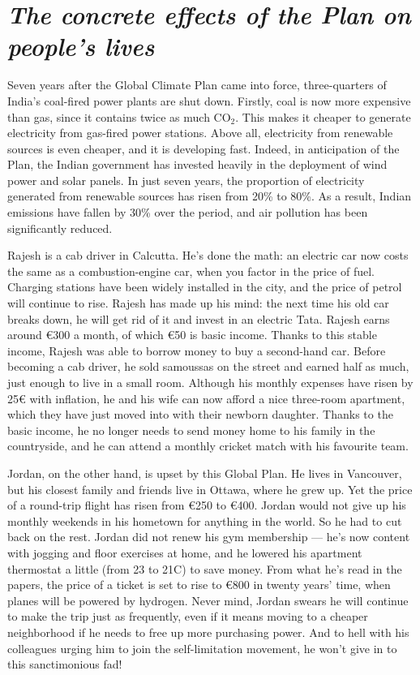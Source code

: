 \documentclass[a5paper,english,openany]{memoir}
\begin{document}
\chapter*{\textit{The concrete effects of the Plan on people's lives}}\label{ch:narr_bilan}

Seven years after the Global Climate Plan came into force, three-quarters of India's coal-fired power plants are shut down. Firstly, coal is now more expensive than gas, since it contains twice as much CO$_\text{2}$. This makes it cheaper to generate electricity from gas-fired power stations. Above all, electricity from renewable sources is even cheaper, and it is developing fast. Indeed, in anticipation of the Plan, the Indian government has invested heavily in the deployment of wind power and solar panels. In just seven years, the proportion of electricity generated from renewable sources has risen from 20\% to 80\%. As a result, Indian emissions have fallen by 30\% over the period, and air pollution has been significantly reduced. 

Rajesh is a cab driver in Calcutta. He's done the math: an electric car now costs the same as a combustion-engine car, when you factor in the price of fuel. Charging stations have been widely installed in the city, and the price of petrol will continue to rise. Rajesh has made up his mind: the next time his old car breaks down, he will get rid of it and invest in an electric Tata. Rajesh earns around \euro{}300 a month, of which \euro{}50 is basic income. Thanks to this stable income, Rajesh was able to borrow money to buy a second-hand car. %
Before becoming a cab driver, he sold samoussas on the street and earned half as much, just enough to live in a small room. Although his monthly expenses have risen by 25\euro{} with inflation, he and his wife can now afford a nice three-room apartment, which they have just moved into with their newborn daughter. Thanks to the basic income, he no longer needs to send money home to his family in the countryside, and he can attend a monthly cricket match with his favourite team. 

Jordan, on the other hand, is upset by this Global Plan. He lives in Vancouver, but his closest family and friends live in Ottawa, where he grew up. Yet the price of a round-trip flight has risen from \euro{}250 to \euro{}400. Jordan would not give up his monthly weekends in his hometown for anything in the world. So he had to cut back on the rest. Jordan did not renew his gym membership --- he's now content with jogging and floor exercises at home, and he lowered his apartment thermostat a little (from 23 to 21\textdegree{}C) to save money. From what he's read in the papers, the price of a ticket is set to rise to \euro{}800 in twenty years' time, when planes will be powered by hydrogen. Never mind, Jordan swears he will continue to make the trip just as frequently, even if it means moving to a cheaper neighborhood if he needs to free up more purchasing power. And to hell with his colleagues urging him to join the self-limitation movement, he won't give in to this sanctimonious fad!
\end{document}
